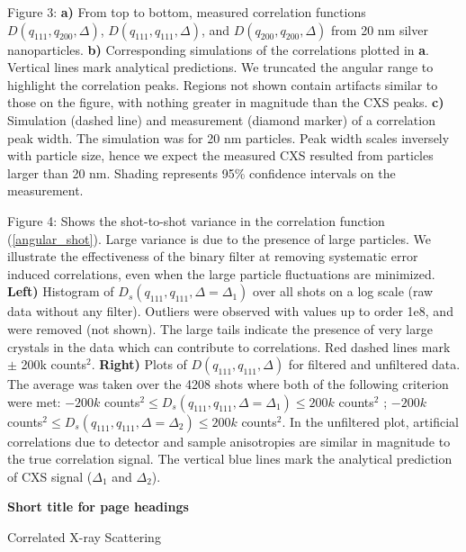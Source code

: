 \documentclass [11pt,fleqn]{article}
\begin{document}
Figure 3:
{\bf a)} From top to bottom, measured correlation functions $D (q_{111},q_{200}, \Delta  )$, $D (q_{111},q_{111}, \Delta  )$, and $D (q_{200},q_{200}, \Delta  )$ from 20 nm silver nanoparticles. {\bf b)} Corresponding simulations of the correlations plotted in {\bf a}. Vertical lines mark analytical predictions. We truncated the angular range to highlight the correlation peaks. Regions not shown contain artifacts similar to those on the figure, with nothing greater in magnitude than the CXS peaks. {\bf c)} Simulation (dashed line) and measurement (diamond marker) of a correlation peak width. The simulation was for 20 nm particles. Peak width scales inversely with particle size, hence we expect the measured CXS resulted from particles larger than 20 nm. Shading represents 95\% confidence intervals on the measurement.

Figure 4:
Shows the shot-to-shot variance in the correlation function (\ref{angular_shot}). Large variance is due to the presence of large particles. We illustrate the effectiveness of the binary filter at removing systematic error induced correlations, even when the large particle fluctuations are minimized. {\bf Left)} Histogram of $D_s(q_{111}, q_{111}, \Delta = \Delta_1)$ over all shots on a log scale (raw data without any filter). Outliers were observed with values up to order 1e8, and were removed (not shown). The large tails indicate the presence of very large crystals in the data which can contribute to correlations. Red dashed lines mark $\pm$ 200k counts$^2$. {\bf Right)} Plots of $D(q_{111}, q_{111}, \Delta)$ for filtered and unfiltered data. The average was taken over the 4208 shots where both of the following criterion were met: $-200k $ counts$^2 \le D_s(q_{111}, q_{111}, \Delta = \Delta_1) \le 200k$ counts$^2$ ; $-200k $ counts$^2 \le D_s(q_{111}, q_{111}, \Delta = \Delta_2) \le 200k$ counts$^2$. In the unfiltered plot, artificial correlations due to detector and sample anisotropies are similar in magnitude to the true correlation signal. The vertical blue lines mark the analytical prediction of CXS signal ($\Delta_1$ and $\Delta_2$).

{\bf Short title for page headings}

Correlated X-ray Scattering
\end{document}
